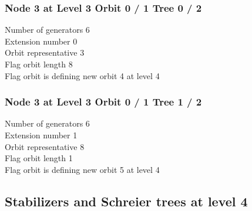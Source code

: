\subsubsection*{Node 3 at Level 3 Orbit 0 / 1 Tree 0 / 2}
Number of generators 6\\

\noindent Extension number 0\\
Orbit representative 3\\
Flag orbit length 8\\
Flag orbit is defining new orbit 4 at level 4\\
\subsubsection*{Node 3 at Level 3 Orbit 0 / 1 Tree 1 / 2}
Number of generators 6\\

\noindent Extension number 1\\
Orbit representative 8\\
Flag orbit length 1\\
Flag orbit is defining new orbit 5 at level 4\\

\subsection{Stabilizers and Schreier trees at level 4}


